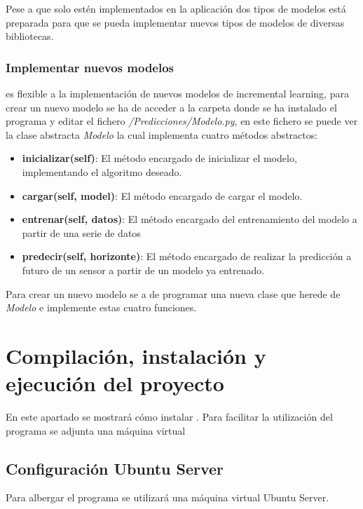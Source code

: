 Pese a que solo estén implementados en la aplicación dos tipos de modelos está preparada para que se pueda implementar nuevos tipos de modelos de diversas bibliotecas.

\subsubsection{Implementar nuevos modelos}

\nombrePrograma es flexible a la implementación de nuevos modelos de incremental learning, para crear un nuevo modelo se ha de acceder a la carpeta donde se ha instalado el programa y editar el fichero \textit{/Predicciones/Modelo.py}, en este fichero se puede ver la clase abstracta \textit{Modelo} la cual implementa cuatro métodos abstractos:
\begin{itemize}
    \item \textbf{inicializar(self)}: El método encargado de inicializar el modelo, implementando el algoritmo deseado.
    
    \item \textbf{cargar(self, model)}:  El método encargado de cargar el modelo.
    
    \item \textbf{entrenar(self, datos)}: El método encargado del entrenamiento del modelo a partir de una serie de datos
    \item \textbf{predecir(self, horizonte)}: El método encargado de realizar la predicción a futuro de un sensor a partir de un modelo ya entrenado.
\end{itemize}

Para crear un nuevo modelo se a de programar una nueva clase que herede de \textit{Modelo} e implemente estas cuatro funciones.

\section{Compilación, instalación y ejecución del proyecto}

En este apartado se mostrará cómo instalar \nombrePrograma. Para facilitar la utilización del programa se adjunta una máquina virtual 

\subsection{Configuración Ubuntu Server}

Para albergar el programa se utilizará una máquina virtual Ubuntu Server.


